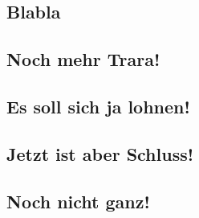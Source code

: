 \documentclass{sasbase}
\begin{document}
\subsection{Blabla}

\lipsum[3]

\subsection{Noch mehr Trara!}

\lipsum[4]

\subsection{Es soll sich ja lohnen!}

\lipsum[5]

\subsection{Jetzt ist aber Schluss!}

\lipsum[6]

\subsection{Noch nicht ganz!}

\lipsum[7]
\end{document}
